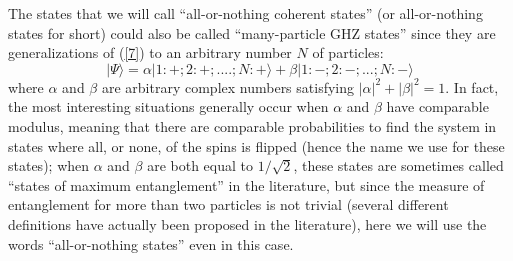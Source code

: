 \documentclass[12pt,onecolumn]{article}%
\begin{document}
\label{complete-ent}

The states that we will call ``all-or-nothing coherent states'' (or
all-or-nothing states for short) could also be called ``many-particle GHZ
states'' since they are generalizations of (\ref{7}) to an arbitrary number
$N$ of particles:%
\begin{equation}
|\Psi\rangle =\alpha|1:+;2:+;....;N:+\rangle +\beta|1:-;2:-;...;N:-\rangle  \label{20}%
\end{equation}
where $\alpha$ and $\beta$ are arbitrary complex numbers satisfying $\left|
\alpha\right|  ^{2}+\left|  \beta\right|  ^{2}=1$. In fact, the most
interesting situations generally occur when $\alpha$ and $\beta$ have
comparable modulus, meaning that there are comparable probabilities to find
the system in states where all, or none, of the spins is flipped (hence the
name we use for these states); when $\alpha$ and $\beta$ are both equal to
$1/\sqrt{2}$, these states are sometimes called ``states of maximum
entanglement'' in the literature, but since the measure of entanglement for
more than two particles is not trivial (several different definitions have
actually been proposed in the literature), here we will use the words
``all-or-nothing states'' even in this case.
\end{document}
